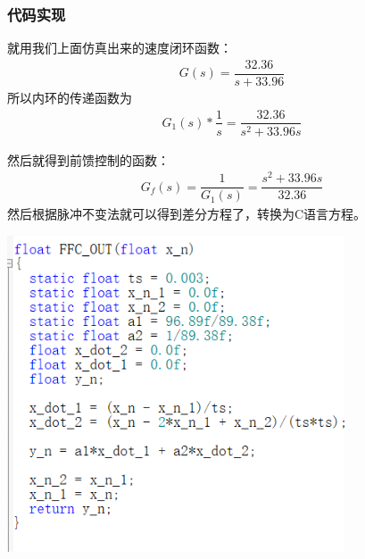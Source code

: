 \documentclass[UTF8,a4paper,12pt]{ctexart}
\begin{document}
      \subsubsection{代码实现}
        就用我们上面仿真出来的速度闭环函数：
        \begin{align*}
          G(s)=\dfrac{32.36}{s+33.96}
        \end{align*}
        所以内环的传递函数为
        \begin{align*}
          G_1(s)*\dfrac{1}{s}=\dfrac{32.36}{s^2+33.96s}
        \end{align*}
        
        然后就得到前馈控制的函数： 
        \begin{align*}
           G_f(s)=\dfrac{1}{G_1(s)}=\dfrac{s^2+33.96s}{32.36}
        \end{align*}
        然后根据脉冲不变法就可以得到差分方程了，转换为C语言方程。\\
        \par \includegraphics[width=10cm]{picture/FFC_function.png} \\
\end{document}
